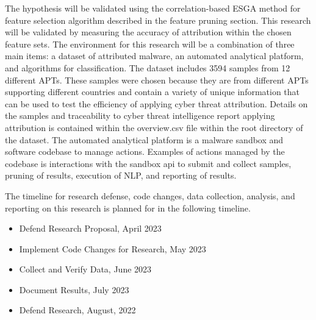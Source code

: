 \documentclass[12pt]{report}
\begin{document}
The hypothesis will be validated using the correlation-based ESGA method for feature selection algorithm described in the feature pruning section.  This research will be validated by measuring the accuracy of attribution within the chosen feature sets.  The environment for this research will be a combination of three main items: a dataset of attributed malware, an automated analytical platform, and algorithms for classification.  The dataset includes 3594 samples from 12 different APTs. \cite{APTMalware2022}  These samples were chosen because they are from different APTs supporting different countries and contain a variety of unique information that can be used to test the efficiency of applying cyber threat attribution.  Details on the samples and traceability to cyber threat intelligence report applying attribution is contained within the overview.csv file within the root directory of the dataset.  The automated analytical platform is a malware sandbox and software codebase to manage actions.  Examples of actions managed by the codebase is interactions with the sandbox api to submit and collect samples, pruning of results, execution of NLP, and reporting of results.

The timeline for research defense, code changes, data collection, analysis, and reporting on this research is planned for in the following timeline.
\begin{itemize}
  \item Defend Research Proposal, April 2023
  \item Implement Code Changes for Research, May 2023
  \item Collect and Verify Data, June 2023
  \item Document Results, July 2023
  \item Defend Research, August, 2022
\end{itemize}
\end{document}
